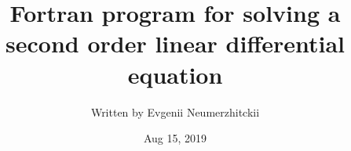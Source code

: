 \documentclass[a4paper,twoside,12pt,hidelinks]{article}
\title{Fortran program for solving a second order linear differential equation}
\author{Written by Evgenii Neumerzhitckii}
\date{Aug 15, 2019}
\begin{document}
\setcounter{secnumdepth}{-1}
\renewcommand{\thepart}{}
\renewcommand{\thesection}{Part \Alph{section}}
\renewcommand{\thesubsection}{\Alph{section}.\arabic{subsection}}
\renewcommand{\partname}{}


\maketitle
\thispagestyle{empty} %
\vspace{3.5cm} %
\tableofcontents
\thispagestyle{empty} %

\pagebreak




\pagebreak
\end{document}
